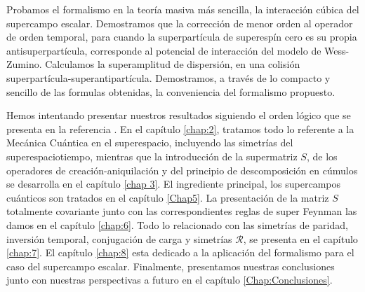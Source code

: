 Probamos el formalismo en la teoría masiva más sencilla, la interacción cúbica del supercampo escalar. Demostramos que la corrección de menor orden al operador de orden temporal, para cuando la superpartícula de superespín cero es su propia antisuperpartícula, corresponde  al potencial de interacción del modelo de Wess-Zumino.  Calculamos la superamplitud de dispersión, en una colisión superpartícula-superantipartícula.  Demostramos, a través de lo compacto y sencillo de las formulas obtenidas, la conveniencia del formalismo propuesto.

Hemos intentando presentar nuestros resultados siguiendo el orden l\'ogico que se presenta en la referencia \cite{Weinberg:1995mt}. En el  capítulo \ref{chap:2}, tratamos todo lo referente a la Mecánica Cuántica en el superespacio, incluyendo las simetrías del superespaciotiempo, mientras que  la introducción de la supermatriz $ S $,  de los operadores de creación-aniquilación y del principio de descomposición en cúmulos   se desarrolla en el capítulo \ref{chap 3}. El ingrediente principal, los supercampos cuánticos son tratados en el capítulo \ref{Chap5}. La presentación de la matriz $ S $ totalmente covariante junto con las correspondientes reglas de super Feynman las damos  en el capítulo \ref{chap:6}.
Todo lo relacionado con las simetrías de  paridad, inversión temporal, conjugación de carga  y simetrías $ \mathcal{R} $,  se presenta en el capítulo \ref{chap:7}. El capítulo \ref{chap:8} esta dedicado  a la aplicación del formalismo para el caso del supercampo escalar. Finalmente, presentamos nuestras conclusiones junto con nuestras perspectivas a futuro en el capítulo \ref{Chap:Conclusiones}. 
 


